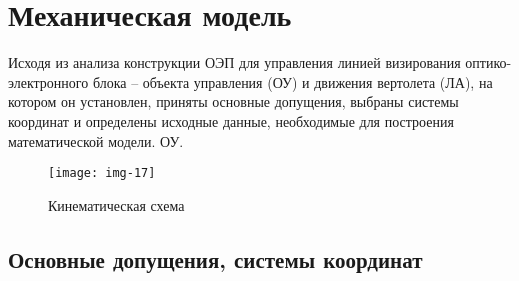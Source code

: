 \section{Механическая модель} \label{ch:ch3/sect2}

Исходя из анализа конструкции ОЭП для управления линией визирования оптико-электронного блока – объекта управления (ОУ) и движения вертолета (ЛА), на котором он установлен, приняты основные допущения, выбраны системы координат и определены исходные данные, необходимые для построения математической модели. ОУ.

\begin{figure}[ht]
	\centering
	\texttt{[image: img-17]} 
	\caption{Кинематическая схема}
	\label{fig:kinematic}
\end{figure}

\subsection{Основные допущения, системы координат} \label{sec:ch3/sec3}

